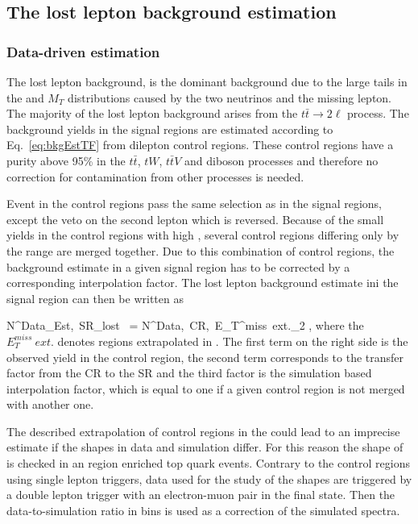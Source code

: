\newpage
\subsection{The lost lepton background estimation}

\subsubsection{Data-driven estimation}

The lost lepton background,  is the dominant background due to the large tails in the \MET and $M_{T}$ distributions caused by the two neutrinos and the missing lepton. The majority of the lost lepton background arises from the $t\bar{t} \to 2\ell$ process. The background yields in the signal regions are estimated according to Eq.~\ref{eq:bkgEstTF} from dilepton control regions. These control regions have a purity above 95\% in the $t\bar{t}$, $tW$, $t\bar{t}V$ and diboson processes and therefore no correction for contamination from other processes is needed. 

Event in the control regions pass the same selection as in the signal regions, except the veto on the second lepton which is reversed. Because of the small yields in the control regions with high \MET, several control regions differing only by the \MET range are merged together. Due to this combination of control regions, the background estimate in a given signal region has to be corrected by a corresponding interpolation factor. The lost lepton background estimate ini the signal region can then be written as

{
N^{Data_{Est},~SR}_{lost~\ell}  =  N^{Data,~CR,~E_{T}^{miss}~ext.}_{2\ell} \times  {} \times {},
}
where the $E_{T}^{miss}~ext.$ denotes regions extrapolated in \MET. The first term on the right side is the observed yield in the control region, the second term corresponds to the transfer factor from the CR to the SR  and the third factor is the simulation based \MET interpolation factor, which is equal to one if a given control region is not merged with another one.

The described extrapolation of control regions in the \MET could lead to an imprecise estimate if the \MET shapes in data and simulation differ. For this reason the shape of \MET is checked in an region enriched top quark events. Contrary to the control regions using single lepton triggers, data used for the study of the \MET shapes are triggered by a  double lepton trigger with an electron-muon pair in the final state. Then the data-to-simulation ratio in \MET bins is used as a correction of the simulated \MET spectra. 

